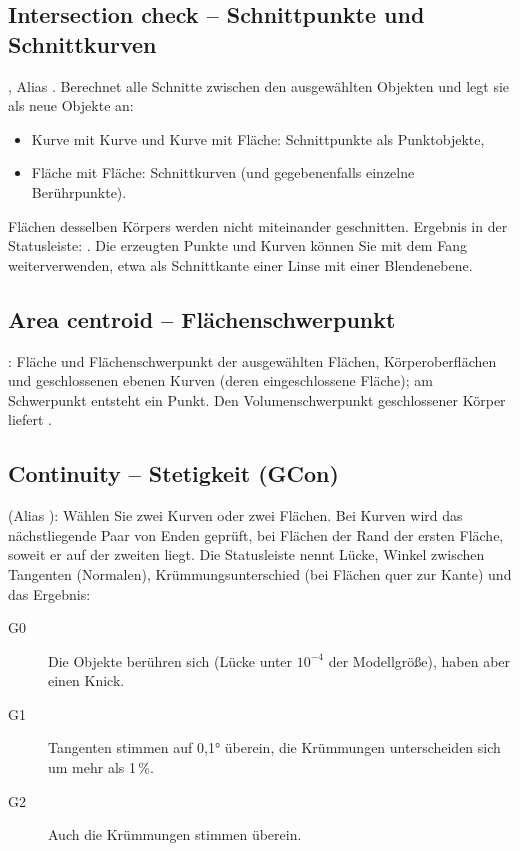 \subsection{Intersection check -- Schnittpunkte und Schnittkurven}\label{sec:cmd-intersect}
, Alias . Berechnet alle Schnitte zwischen den
ausgewählten Objekten und legt sie als neue Objekte an:
\begin{itemize}
\item Kurve mit Kurve und Kurve mit Fläche: Schnittpunkte als Punktobjekte,
\item Fläche mit Fläche: Schnittkurven (und gegebenenfalls einzelne Berührpunkte).
\end{itemize}
Flächen desselben Körpers werden nicht miteinander geschnitten. Ergebnis in der Statusleiste:
. Die erzeugten Punkte und Kurven können Sie mit
dem Fang weiterverwenden, etwa als Schnittkante einer Linse mit einer Blendenebene.

\subsection{Area centroid -- Flächenschwerpunkt}\label{sec:cmd-areacentroid}
: Fläche und Flächenschwerpunkt der ausgewählten Flächen, Körperoberflächen und
geschlossenen ebenen Kurven (deren eingeschlossene Fläche); am Schwerpunkt entsteht ein Punkt.
Den Volumenschwerpunkt geschlossener Körper liefert .

\subsection{Continuity -- Stetigkeit (GCon)}\label{sec:cmd-gcon}
 (Alias ): Wählen Sie zwei Kurven oder zwei Flächen. Bei Kurven wird
das nächstliegende Paar von Enden geprüft, bei Flächen der Rand der ersten Fläche, soweit er auf der
zweiten liegt. Die Statusleiste nennt Lücke, Winkel zwischen Tangenten (Normalen),
Krümmungsunterschied (bei Flächen quer zur Kante) und das Ergebnis:
\begin{description}
\item[G0] Die Objekte berühren sich (Lücke unter $10^{-4}$ der Modellgröße), haben aber einen Knick.
\item[G1] Tangenten stimmen auf 0,1° überein, die Krümmungen unterscheiden sich um mehr als 1\,\%.
\item[G2] Auch die Krümmungen stimmen überein.
\end{description}

